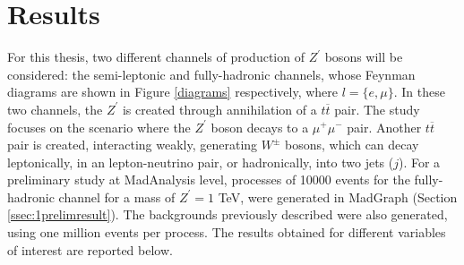 \clearpage
\vspace{1cm}
\section{Results} \label{sec:results}
\vspace{1cm}

For this thesis, two different channels of production of $Z^{\prime}$ bosons will be considered: the semi-leptonic and fully-hadronic channels, whose Feynman diagrams are shown in Figure \ref{diagrams} respectively, where $l = \{e, \mu\}$. In these two channels, the $Z^{\prime}$ is created through annihilation of a $t\overline{t}$ pair. The study focuses on the scenario where the $Z^{\prime}$ boson decays to a $\mu^+\mu^-$ pair. Another $t\overline{t}$ pair is created, interacting weakly, generating $W^{\pm}$ bosons, which can decay leptonically, in an lepton-neutrino pair, or hadronically, into two jets ($j$). For a preliminary study at MadAnalysis level, processes of 10000 events for the fully-hadronic channel for a mass of $Z^{\prime}=1$ TeV, were generated in MadGraph (Section \ref{ssec:1prelimresult}). The backgrounds previously described were also generated, using one million events per process. The results obtained for different variables of interest are reported below.

